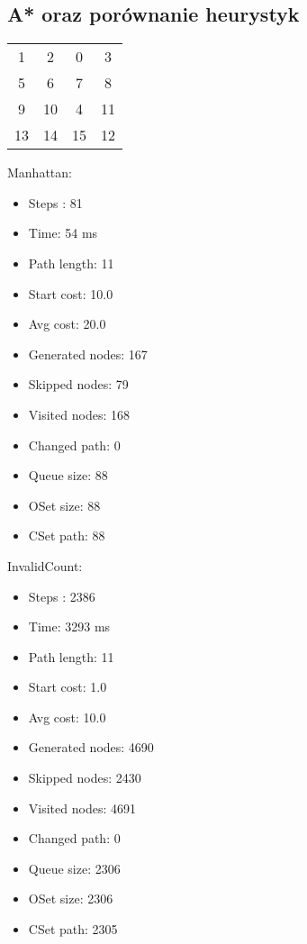 \documentclass{classrep}
\begin{document}
			\subsection{A* oraz porównanie heurystyk}
				\begin{center}
					\begin{tabular}{ c c c c }
	  						1 & 2 & 0 & 3 \\
	  						5 & 6 & 7 & 8 \\
	  						9 & 10 & 4 & 11 \\
	  						13 & 14 & 15 & 12 \\
					\end{tabular}
				\end{center}
					Manhattan:
					\begin{itemize}
						\item Steps :					81
						\item Time:					54 ms
						\item Path length:			11
						\item Start cost:				10.0
						\item Avg cost:				20.0
						\item Generated nodes:		167
						\item Skipped nodes:			79
						\item Visited nodes:			168
						\item Changed path:			0
						\item Queue size:				88
						\item OSet size:				88
						\item CSet path:				88
					\end{itemize}
					InvalidCount:
					\begin{itemize}
						\item Steps :					2386
						\item Time:					3293 ms
						\item Path length:			11
						\item Start cost:				1.0
						\item Avg cost:				10.0
						\item Generated nodes:		4690
						\item Skipped nodes:			2430
						\item Visited nodes:			4691
						\item Changed path:			0
						\item Queue size:				2306
						\item OSet size:				2306
						\item CSet path:				2305
					\end{itemize}
\end{document}
